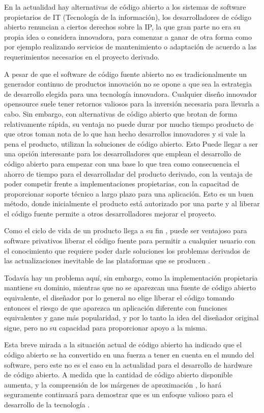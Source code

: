 \documentclass[a4paper,11pt]{article}
\begin{document}
En la actualidad hay alternativas de código abierto a los sistemas de software propietarios de IT (Tecnología de la información),  los desarrolladores de código abierto renuncian a ciertos derechos sobre la IP, la que gran parte no era su propia idea o considera innovadora, para comenzar a ganar de otra forma como por ejemplo realizando servicios de mantenimiento o adaptación de acuerdo a las requerimientos necesarios en el proyecto derivado.

A pesar de que el software de código fuente abierto no es tradicionalmente un generador continuo de productos innovación no se opone a que sea la estrategia de desarrollo elegida para una tecnología innovadora. Cualquier diseño innovador opensource suele tener retornos valiosos para la inversión necesaria para llevarla a cabo. Sin embargo, con alternativas de código abierto que brotan de forma relativamente rápida, su ventaja no puede durar por mucho tiempo producto de que otros toman nota de lo que han hecho desarrollos innovadores y si vale la pena el producto, utilizan la soluciones de código abierto. Esto  Puede llegar a ser una opción interesante para los desarrolladores que emplean el desarrollo de código abierto para empezar con una base lo que trea como consecuencia el ahorro de tiempo para el desarrolladar del producto derivado, con la ventaja  de poder competir frente a  implementaciones propietarias, con la capacitad de proporcionar soporte técnico a largo plazo para una aplicación. Esto es un buen método, donde inicialmente el producto está autorizado por una parte y al liberar  el código fuente permite a otros desarrolladores mejorar el proyecto.

Como el ciclo de vida de un producto llega a su fin , puede ser ventajoso para software privativos liberar el código fuente para permitir a cualquier usuario con el conocimiento que requiere poder darle soluciones los problemas derivados de las actualizaciones inevitable de las plataformas que se producen . 

Todavía hay un problema aquí, sin embargo, como la implementación propietaria
mantiene su dominio, mientras que no se aparezcan una fuente de código abierto equivalente, el diseñador por lo general no elige liberar el código tomando entonces el riesgo de que aparezca un aplicación diferente con funciones equivalentes y gane más popularidad,  y por lo tanto la idea del diseñador original sigue, pero no su capacidad para proporcionar apoyo a la misma.

Esta breve mirada a la situación actual de código abierto ha indicado que el código abierto
se ha convertido en una fuerza a tener en cuenta en el mundo del software, pero este no es el caso en la actualidad para el desarrollo de hardware de código abierto.
 A medida que la cantidad de código abierto disponible aumenta, y la comprensión de los márgenes de aproximación , lo hará
seguramente continuará para demostrar que es un enfoque valioso para el desarrollo de
la tecnología .
\end{document}
